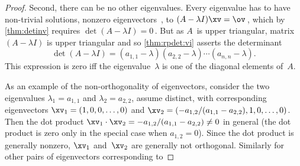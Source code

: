 \begin{proof}
Second, there can be no other eigenvalues.
Every eigenvalue has to have non-trivial solutions, nonzero eigenvectors~\xv, to \((A-\lambda I)\xv=\ov\)\,, which by \cref{thm:detinv} requires \(\det(A-\lambda I)=0\)\,.
But as \(A\)~is upper triangular, matrix \((A-\lambda I)\) is upper triangular and so \cref{thm:rpdet:vi} asserts the determinant
\begin{equation*}
\det(A-\lambda I)=(a_{1,1}-\lambda)(a_{2,2}-\lambda)
\cdots(a_{n,n}-\lambda).
\end{equation*}
This expression is zero iff the eigenvalue~\(\lambda\) is one of the diagonal elements of~\(A\).

As an example of the non-orthogonality of eigenvectors, consider the two eigenvalues \(\lambda_1=a_{1,1}\) and \(\lambda_2=a_{2,2}\), assume distinct, with  corresponding eigenvectors \(\xv_1=(1,0,0,\ldots,0)\) and \(\xv_2=(-a_{1,2}/(a_{1,1}-a_{2,2}),1,0,\ldots,0)\).
Then the dot product \(\xv_1\cdot\xv_2=-a_{1,2}/(a_{1,1}-a_{2,2})\neq 0\) in general (the dot product is zero only in the special case when \(a_{1,2}=0\)).
Since the dot product is generally nonzero, \(\xv_1\) and~\(\xv_2\) are generally not orthogonal.
Similarly for other pairs of eigenvectors corresponding to 
\end{proof}



